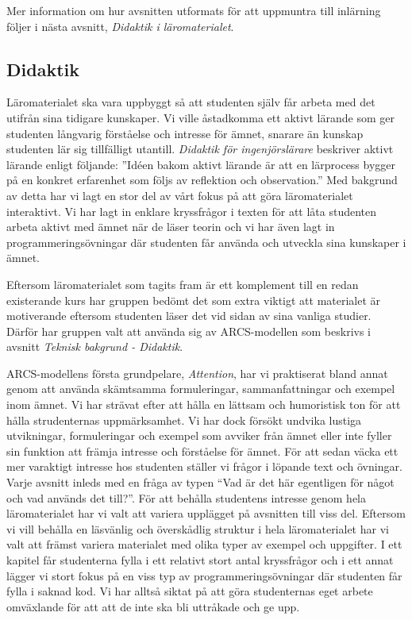 \documentclass[]{article}
\begin{document}
Mer information om hur avsnitten utformats för att uppmuntra till inlärning följer i nästa avsnitt,
\textit{Didaktik i läromaterialet}.

\subsection{Didaktik}
Läromaterialet ska vara uppbyggt så att studenten själv får arbeta med det utifrån sina tidigare
kunskaper. Vi ville åstadkomma ett aktivt lärande som ger studenten långvarig förståelse och
intresse för ämnet, snarare än kunskap studenten lär sig tillfälligt utantill. \textit{Didaktik för
ingenjörslärare} beskriver aktivt lärande enligt följande: ”Idéen bakom aktivt lärande är att en
lärprocess bygger på en konkret erfarenhet som följs av reflektion och observation.” Med bakgrund av
detta har vi lagt en stor del av vårt fokus på att göra läromaterialet interaktivt. Vi har lagt in
enklare kryssfrågor i texten för att låta studenten arbeta aktivt med ämnet när de läser teorin och
vi har även lagt in programmeringsövningar där studenten får använda och utveckla sina kunskaper i
ämnet.

Eftersom läromaterialet som tagits fram är ett komplement till en redan existerande kurs har gruppen
bedömt det som extra viktigt att materialet är motiverande eftersom studenten läser det vid sidan av
sina vanliga studier. Därför har gruppen valt att använda sig av ARCS-modellen som beskrivs i avsnitt
\textit{Teknisk bakgrund - Didaktik}.

ARCS-modellens första grundpelare, \textit{Attention}, har vi praktiserat bland annat genom att använda
skämtsamma formuleringar, sammanfattningar och exempel inom ämnet. Vi har strävat efter att hålla en
lättsam och humoristisk ton för att hålla strudenternas uppmärksamhet. Vi har dock försökt undvika
lustiga utvikningar, formuleringar och exempel som avviker från ämnet eller inte fyller sin funktion
att främja intresse och förståelse för ämnet. För att sedan väcka ett mer varaktigt intresse hos
studenten ställer vi frågor i löpande text och övningar. Varje avsnitt inleds med en fråga av typen
“Vad är det här egentligen för något och vad används det till?”. För att behålla studentens intresse
genom hela läromaterialet har vi valt att variera upplägget på avsnitten till viss del. Eftersom vi
vill behålla en läsvänlig och överskådlig struktur i hela läromaterialet har vi valt att främst variera
materialet med olika typer av exempel och uppgifter. I ett kapitel får studenterna fylla i ett relativt
stort antal kryssfrågor och i ett annat lägger vi stort fokus på en viss typ av programmeringsövningar
där studenten får fylla i saknad kod. Vi har alltså siktat på att göra studenternas eget arbete
omväxlande för att att de inte ska bli uttråkade och ge upp.
\end{document}
